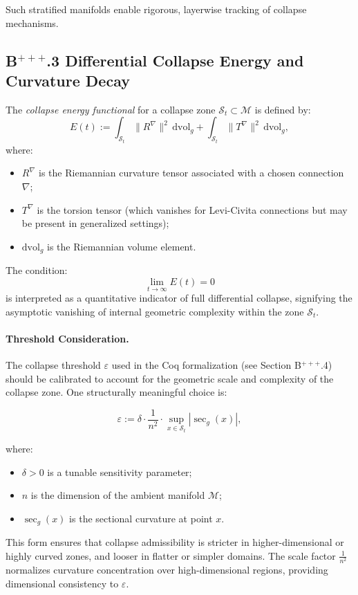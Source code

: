 \documentclass[11pt]{article}
\begin{document}
Such stratified manifolds enable rigorous, layerwise tracking of collapse mechanisms.

\subsection*{B$^{+++}$.3 Differential Collapse Energy and Curvature Decay}

The \emph{collapse energy functional} for a collapse zone \( \mathcal{S}_t \subset \mathcal{M} \) is defined by:
\[
E(t) := \int_{\mathcal{S}_t} \| R^\nabla \|^2 \, \mathrm{dvol}_g + \int_{\mathcal{S}_t} \| T^\nabla \|^2 \, \mathrm{dvol}_g,
\]
where:
\begin{itemize}
  \item \( R^\nabla \) is the Riemannian curvature tensor associated with a chosen connection \( \nabla \);
  \item \( T^\nabla \) is the torsion tensor (which vanishes for Levi-Civita connections but may be present in generalized settings);
  \item \( \mathrm{dvol}_g \) is the Riemannian volume element.
\end{itemize}

The condition:
\[
\lim_{t \to \infty} E(t) = 0
\]
is interpreted as a quantitative indicator of full differential collapse, signifying the asymptotic vanishing of internal geometric complexity within the zone \( \mathcal{S}_t \).

\paragraph{Threshold Consideration.}
The collapse threshold \( \varepsilon \) used in the Coq formalization (see Section B$^{+++}$.4) should be calibrated to account for the geometric scale and complexity of the collapse zone. One structurally meaningful choice is:

\[
\varepsilon := \delta \cdot \frac{1}{n^2} \cdot \sup_{x \in \mathcal{S}_t} |\sec_g(x)|,
\]

where:
\begin{itemize}
  \item \( \delta > 0 \) is a tunable sensitivity parameter;
  \item \( n \) is the dimension of the ambient manifold \( \mathcal{M} \);
  \item \( \sec_g(x) \) is the sectional curvature at point \( x \).
\end{itemize}

This form ensures that collapse admissibility is stricter in higher-dimensional or highly curved zones, and looser in flatter or simpler domains. The scale factor \( \frac{1}{n^2} \) normalizes curvature concentration over high-dimensional regions, providing dimensional consistency to \( \varepsilon \).
\end{document}
